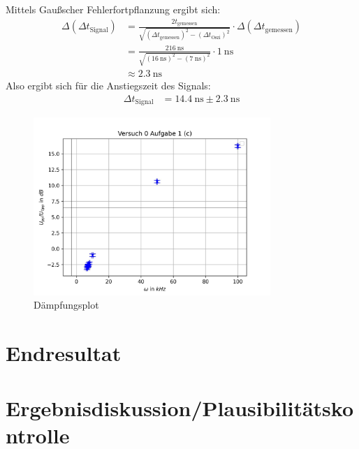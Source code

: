 \documentclass{article}
\begin{document}
				Mittels Gaußscher Fehlerfortpflanzung ergibt sich:
				\begin{align*}
					\Delta(\Delta t_\mathrm{Signal}) &= \frac{2 t_\mathrm{gemessen}}{\sqrt{(\Delta t_\mathrm{gemessen})^2 - (\Delta t_\mathrm{Oszi})^2}} \cdot \Delta(\Delta t_\mathrm{gemessen}) \\
					&= \frac{2 \SI{16}{\nano\second}}{\sqrt{(\SI{16}{\nano\second})^2 - (\SI{7}{\nano\second})^2}} \cdot \SI{1}{\nano\second} \\
					&\approx \SI{2.3}{\nano\second}
				\end{align*}
				Also ergibt sich für die Anstiegszeit des Signals:
				\begin{align*}
					\Delta t_\mathrm{Signal} &= \SI{14.4}{\nano\second} \pm \SI{2.3}{\nano\second}
				\end{align*}
	
				\begin{figure}[H]
					\centering
					\includegraphics[width=0.8\textwidth]{pythonAuswertungen/Versuch 0 Aufgabe 1 (c)_plot.jpg}
					\caption{Dämpfungsplot}
					\label{0_1_(c)_Dämpfung}
				\end{figure}
		

		\section{Endresultat}
		\section{Ergebnisdiskussion/Plausibilitätskontrolle}
			
\end{document}
